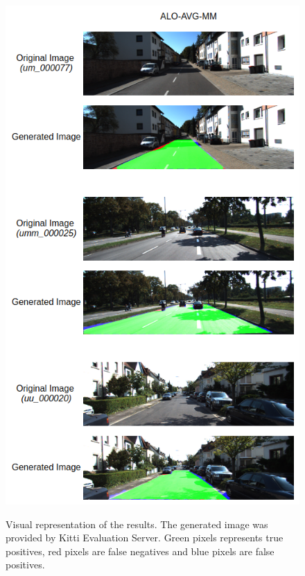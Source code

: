 \begin{figure}
  \caption{Visual representation of the results. The generated image was provided by Kitti Evaluation Server. Green pixels represents true positives, red pixels are false negatives and blue pixels are false positives.}
  \centering
  \includegraphics[width=1.\columnwidth]{figures/falreis/visual_representation.png}
  \label{fig:visual_representation}
\end{figure}
